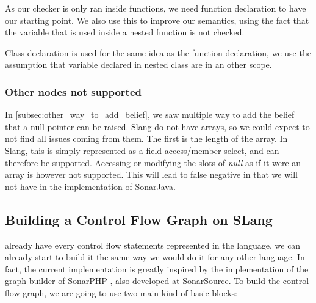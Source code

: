 As our checker is only ran inside functions, we need function declaration to have our starting point. 
We also use this to improve our semantics, using the fact that the variable that is used inside a nested function is not checked.

Class declaration is used for the same idea as the function declaration, we use the assumption that variable declared in nested class are in an other scope.


\subsubsection{Other nodes not supported}
\label{subsubsec:other_nodes_not_supported}

In \ref{subsec:other_way_to_add_belief}, we saw multiple way to add the belief that a null pointer can be raised. 
Slang do not have arrays, so we could expect to not find all issues coming from them. 
The first is the length of the array. In Slang, this is simply represented as a field access/member select, and can therefore be supported. 
Accessing or modifying the slots of \emph{null} as if it were an array is however not supported. This will lead to false negative in \slang{} that we will not have in the implementation of SonarJava.

\subsection{Building a Control Flow Graph on SLang}
\label{subsec:cfg_on_slang}

\slang{} already have every control flow statements represented in the language, we can already start to build it the same way we would do it for any other language. 
In fact, the current implementation is greatly inspired by the implementation of the graph builder of SonarPHP \cite{SonarPHP:2019:Online}, also developed at SonarSource. 
To build the control flow graph, we are going to use two main kind of basic blocks:

